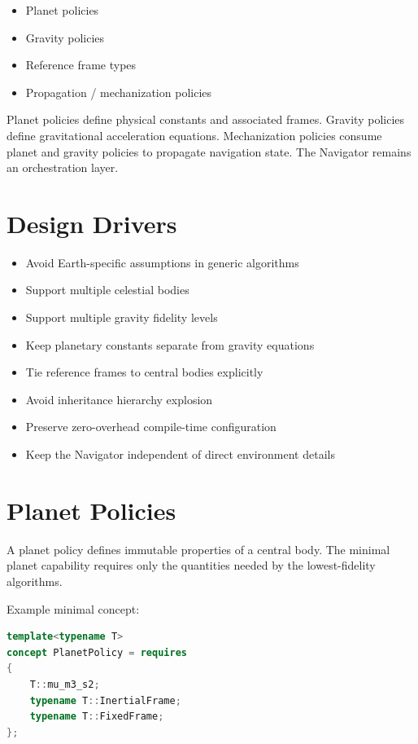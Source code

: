 \documentclass[11pt]{article}
\begin{document}
\begin{itemize}
    \item Planet policies
    \item Gravity policies
    \item Reference frame types
    \item Propagation / mechanization policies
\end{itemize}

Planet policies define physical constants and associated frames. Gravity
policies define gravitational acceleration equations. Mechanization policies
consume planet and gravity policies to propagate navigation state. The
Navigator remains an orchestration layer.

\section{Design Drivers}

\begin{itemize}
    \item Avoid Earth-specific assumptions in generic algorithms
    \item Support multiple celestial bodies
    \item Support multiple gravity fidelity levels
    \item Keep planetary constants separate from gravity equations
    \item Tie reference frames to central bodies explicitly
    \item Avoid inheritance hierarchy explosion
    \item Preserve zero-overhead compile-time configuration
    \item Keep the Navigator independent of direct environment details
\end{itemize}

\section{Planet Policies}

A planet policy defines immutable properties of a central body. The minimal
planet capability requires only the quantities needed by the lowest-fidelity
algorithms.

Example minimal concept:

\begin{lstlisting}[language=C++]
template<typename T>
concept PlanetPolicy = requires
{
    T::mu_m3_s2;
    typename T::InertialFrame;
    typename T::FixedFrame;
};
\end{lstlisting}
\end{document}
